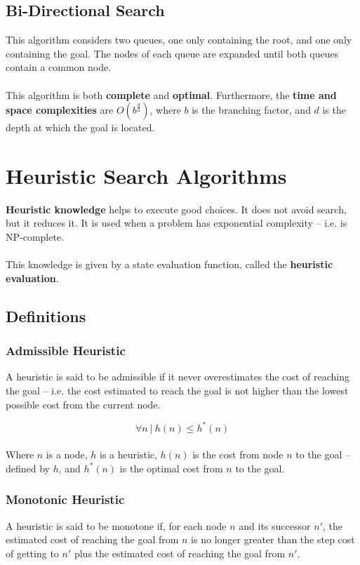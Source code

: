 \documentclass{article}
\begin{document}
\subsection{Bi-Directional Search}
This algorithm considers two queues, one only containing the root, and one only containing the goal. The nodes of each queue are expanded until both queues contain a common node. \\ \\
This algorithm is both \textbf{complete} and \textbf{optimal}. Furthermore, the \textbf{time and space complexities} are $O(b ^{\frac{d}{2}})$, where $b$ is the branching factor, and $d$ is the depth at which the goal is located.

\section{Heuristic Search Algorithms}
\textbf{Heuristic knowledge} helps to execute good choices. It does not avoid search, but it reduces it. It is used when a problem has exponential complexity -- i.e. is NP-complete. \\ \\
This knowledge is given by a state evaluation function, called the \textbf{heuristic evaluation}.

\subsection{Definitions}
\subsubsection{Admissible Heuristic}
A heuristic is said to be admissible if it never overestimates the cost of reaching the goal -- i.e. the cost estimated to reach the goal is not higher than the lowest possible cost from the current node.

\[ \forall n~|~h(n) \leq h^*(n) \] \\
Where $n$ is a node, $h$ is a heuristic, $h(n)$ is the cost from node $n$ to the goal -- defined by $h$, and $h^*(n)$ is the optimal cost from $n$ to the goal.

\subsubsection{Monotonic Heuristic}
A heuristic is said to be monotone if, for each node $n$ and its successor $n'$, the estimated cost of reaching the goal from $n$ is no longer greater than the step cost of getting to $n'$ plus the estimated cost of reaching the goal from $n'$.
\end{document}
